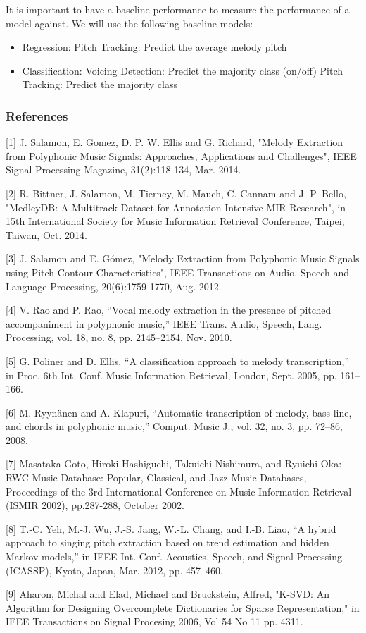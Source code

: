 \documentclass{article} %
\begin{document}
It is important to have a baseline performance to measure the performance of a model against.  We will use the following baseline models:

\begin{itemize}
\item Regression:
\subitem Pitch Tracking: Predict the average melody pitch
\item Classification:
\subitem Voicing Detection:  Predict the majority class (on/off)
\subitem Pitch Tracking: Predict the majority class
\end{itemize}



\subsubsection*{References}


\small{
[1] J. Salamon, E. Gomez, D. P. W. Ellis and G. Richard, "Melody Extraction from Polyphonic Music Signals: Approaches, Applications and Challenges", IEEE Signal Processing Magazine, 31(2):118-134, Mar. 2014.

[2] R. Bittner, J. Salamon, M. Tierney, M. Mauch, C. Cannam and J. P. Bello, "MedleyDB: A Multitrack Dataset for Annotation-Intensive MIR Research", in 15th International Society for Music Information Retrieval Conference, Taipei, Taiwan, Oct. 2014.

[3] J. Salamon and E. Gómez, "Melody Extraction from Polyphonic Music Signals using Pitch Contour Characteristics", IEEE Transactions on Audio, Speech and Language Processing, 20(6):1759-1770, Aug. 2012.

[4] V. Rao and P. Rao, “Vocal melody extraction in the presence of pitched accompaniment
in polyphonic music,” IEEE Trans. Audio, Speech, Lang. Processing, vol. 18,
no. 8, pp. 2145–2154, Nov. 2010. 

[5] G. Poliner and D. Ellis, “A classification approach to melody transcription,” in Proc. 6th Int. Conf. Music Information Retrieval, London, Sept. 2005, pp. 161–166. 

[6] M. Ryynänen and A. Klapuri, “Automatic transcription of melody, bass line, and chords in polyphonic music,” Comput. Music J., vol. 32, no. 3, pp. 72–86, 2008. 

[7] Masataka Goto, Hiroki Hashiguchi, Takuichi Nishimura, and Ryuichi Oka: RWC Music Database: Popular, Classical, and Jazz Music Databases, Proceedings of the 3rd International Conference on Music Information Retrieval (ISMIR 2002), pp.287-288, October 2002. 

[8] T.-C. Yeh, M.-J. Wu, J.-S. Jang, W.-L. Chang, and I.-B. Liao, “A hybrid approach to singing pitch extraction based on trend estimation and hidden Markov models,” in IEEE Int. Conf. Acoustics, Speech, and Signal Processing (ICASSP), Kyoto, Japan, Mar. 2012, pp. 457–460.

[9] Aharon, Michal and Elad, Michael and Bruckstein, Alfred, "K-SVD: An Algorithm for Designing Overcomplete Dictionaries for Sparse Representation," in IEEE Transactions on Signal Procesing 2006, Vol 54 No 11 pp. 4311.
}
\end{document}
